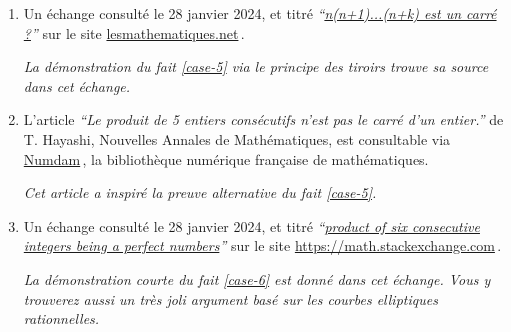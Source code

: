 

\begin{enumerate}
	\item Un échange consulté le 28 janvier 2024, et titré 
	\emph{\enquote{\href{https://les-mathematiques.net/vanilla/discussion/comment/351293}{n(n+1)...(n+k) est un carré ?}}} 
	sur le site \url{lesmathematiques.net}\,.
	
	\smallskip
	\noindent
	\emph{La démonstration du fait \ref{case-5}  via le principe des tiroirs trouve sa source dans cet échange.}


	\item L'article \emph{\enquote{Le produit de 5 entiers consécutifs n'est pas le carré d'un entier.}} de T. Hayashi, Nouvelles Annales de Mathématiques, est consultable via \href{https://numdam.org}{Numdam}\,, la bibliothèque numérique française de mathématiques.
	
	\smallskip
	\noindent
	\emph{Cet article a inspiré la preuve alternative du fait \ref{case-5}.}




	\item Un échange consulté le 28 janvier 2024, et titré
	\emph{\enquote{\href{https://math.stackexchange.com/questions/90894/product-of-six-consecutive-integers-being-a-perfect-square}{product of six consecutive integers being a perfect numbers}}} 
	sur le site \url{https://math.stackexchange.com}\,.
	
	\smallskip
	\noindent
	\emph{La démonstration courte du fait \ref{case-6} est donné dans cet échange. Vous y trouverez aussi un très joli argument basé sur les courbes elliptiques rationnelles.}
\end{enumerate}
